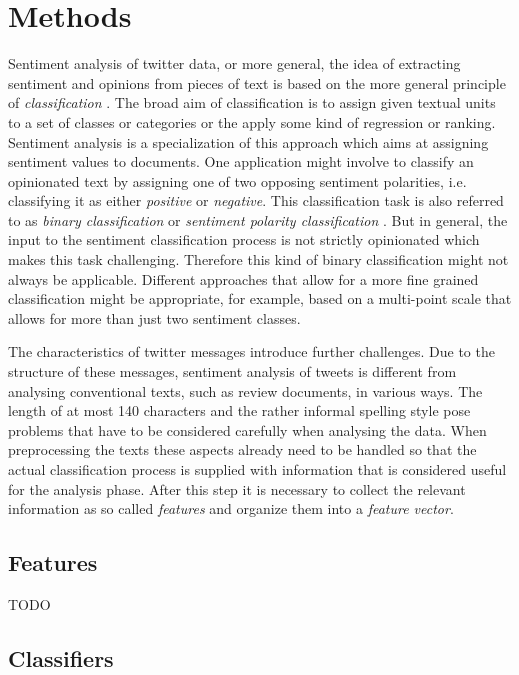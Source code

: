 \section{Methods}

Sentiment analysis of twitter data, or more general, the idea of extracting sentiment and opinions from pieces of text is based on the more general principle of \emph{classification} \cite{Pang2002}. The broad aim of classification is to assign given textual units to a set of classes or categories or the apply some kind of regression or ranking. Sentiment analysis is a specialization of this approach which aims at assigning sentiment values to documents. One application might involve to classify an opinionated text by assigning one of two opposing sentiment polarities, i.e. classifying it as either \emph{positive} or \emph{negative}. This classification task is also referred to as \emph{binary classification} or \emph{sentiment polarity classification} \cite{Pang2002}. But in general, the input to the sentiment classification process is not strictly opinionated which makes this task challenging. Therefore this kind of binary classification might not always be applicable. Different approaches that allow for a more fine grained classification might be appropriate, for example, based on a multi-point scale that allows for more than just two sentiment classes.

The characteristics of twitter messages introduce further challenges. Due to the structure of these messages, sentiment analysis of tweets is different from analysing conventional texts, such as review documents, in various ways. The length of at most 140 characters and the rather informal spelling style pose problems that have to be considered carefully when analysing the data. When preprocessing the texts these aspects already need to be handled so that the actual classification process is supplied with information that is considered useful for the analysis phase. After this step it is necessary to collect the relevant information as so called \emph{features} and organize them into a \emph{feature vector}.

\subsection{Features}

TODO

\subsection{Classifiers}

